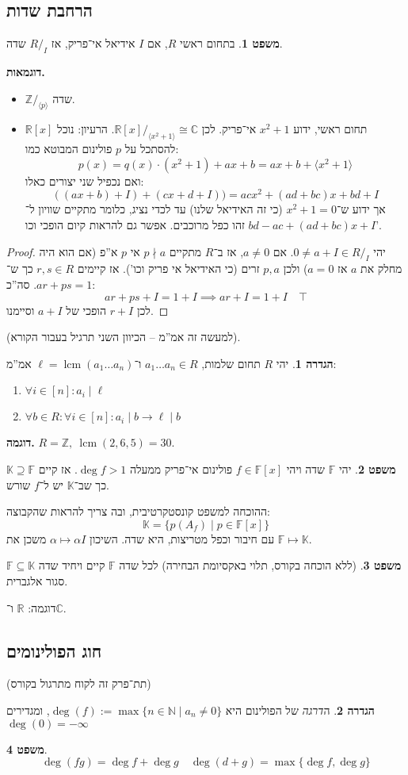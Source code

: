 \documentclass[a4paper]{article}
\newcommand\N     {\mathbb{N}}
\newcommand\Z     {\mathbb{Z}}
\newcommand\R     {\mathbb{R}}
\newcommand\C     {\mathbb{C}}
\newcommand\K     {\mathbb{K}}
\newcommand\ml    {\ell}
\newcommand\so    {\longrightarrow}
\newcommand\ra    {\rangle}
\newcommand\la    {\langle}
\renewcommand\inf {\infty}
\DeclareMathOperator{\lcm}     {lcm}
\newcommand\F         {\mathbb{F}}
\newcommand\co        {\colon}
\newcommand\ag        {\alpha}
\theoremstyle{definition}
\newtheorem{Theorem}{\color{myblue}משפט}
\newtheorem{Definition}{\color{mygreen}הגדרה}
\newcommand\theo  [1] {\begin{Theorem}#1\end{Theorem}}
\newcommand\defi  [1] {\begin{Definition}#1\end{Definition}}
\begin{document}
	\subsection{הרחבת שדות}
	\theo{בתחום ראשי $R$, אם $I$ אידיאל אי־פריק, אז $R/_I$ שדה. }
	
	\textbf{דוגמאות. }
	\begin{itemize}
		\item $\Z/_{\la p \ra}$ שדה. 
		\item $\R[x]$ תחום ראשי, ידוע $x^2 + 1$ אי־פריק. לכן $\R[x]/_{\la x^2 + 1\ra}\cong \C$. הרעיון: נוכל להסתכל על $p$ פולינום המבוטא כמו: 
		\[ p(x) = q(x) \cdot (x^2 + 1) + ax + b = ax +b + \la x^2 + 1\ra \]
		ואם נכפיל שני יצורים כאלו: 
		\[ ((ax + b) + I) + (cx + d + I)) = acx^2 + (ad + bc)x + bd + I \]
		אך ידוע ש־$x^2 + 1 = 0$ (כי זה האידיאל שלנו) עד לכדי נציג, כלומר מתקיים שוויון ל־$bd - ac + (ad + bc)x + I$ זהו כפל מרוכבים. אפשר גם להראות קיום הופכי וכו'. 
	\end{itemize}
	\begin{proof}
		יהי $0 \neq a + I \in R/_I$. אם $a \neq 0$, אז ב־$R$ מתקיים $p \nmid a$ אי $p$ א''פ (אם הוא היה מחלק את $a$ אז $a = 0$) ולכן $p, a$ זרים (כי האידיאל אי פריק וכו'). אז קיימים $r, s \in R$ כך ש־$ar + ps = 1$. סה''כ: 
		\[ ar + ps + I = 1 + I \implies ar + I = 1 + I \quad \top \]
		לכן $r + I$ הופכי של $a + I$ וסיימנו. 
	\end{proof}
	(למעשה זה אמ''מ – הכיוון השני תרגיל בעבור הקורא). 
	
	\defi{יהי $R$ תחום שלמות, $a_1 \dots a_n \in R$ ו־$\ml = \lcm(a_1 \dots a_n)$ אמ''מ: 
		\begin{enumerate}
			\item \hfil $\forall i \in [n] \co a_i \mid \ml$
			\item \hfil $\forall b \in R \co \forall i \in [n] \co a_i \mid b \so \ml \mid b$
	\end{enumerate}}
	\textbf{דוגמה. }$R = \Z, \ \lcm(2, 6, 5) = 30$. 
	
	\theo{יהי $\F$ שדה ויהי $f \in \F[x]$ פולינום אי־פריק ממעלה $\deg f > 1$. אז קיים $\K \supseteq \F$ כך שב־$\K$ יש ל־$f$ שורש. }
	ההוכחה למשפט קונסטקרטיבית, ובה צריך להראות שהקבוצה: 
	\[ \K = \{p(A_f) \mid p \in \F[x]\} \]
	עם חיבור וכפל מטריצות, היא שדה. השיכון $\ag \mapsto \ag I$ משכן את $\F \mapsto \K$. 
	
	
	\theo{(ללא הוכחה בקורס, תלוי באקסיומת הבחירה) לכל שדה $\F$ קיים ויחיד שדה $\F \subseteq \K$ סגור אלגברית. }
	דוגמה: $\R$ ו־$\C$. 
	
	\subsection{חוג הפולינומים}
	(תת־פרק זה לקוח מתרגול בקורס)
	\defi{ה\textit{דרגה} של הפולינום היא $\deg(f) := \max\{n \in \N \mid a_n \neq 0\}$, ומגדירים $\deg(0) = -\inf$}
	\theo{
	\[ \deg(fg) = \deg f + \deg g \quad \deg(d + g) = \max\{\deg f, \deg g\} \]}
	
\end{document}
